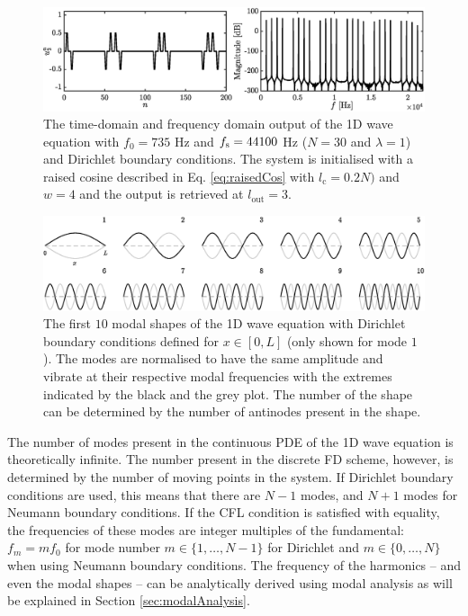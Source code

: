 \begin{figure}[h]
    \includegraphics[width=\textwidth]{figures/fdtd/oneDWaveOutput.eps}
    \caption{The time-domain and frequency domain output of the 1D wave equation with $f_0 = 735$ Hz and $f_\text{s} = 44100$ Hz ($N = 30$ and $\lambda = 1$) and Dirichlet boundary conditions. The system is initialised with a raised cosine described in Eq. \eqref{eq:raisedCos} with $l_\text{c} = 0.2N)$ and $w=4$ and the output is retrieved at $l_\text{out} = 3$. \label{fig:1DWaveOutput}}
\end{figure}

\begin{figure}[h]
    \includegraphics[width=\textwidth]{figures/fdtd/modes.eps}
    \caption{The first $10$ modal shapes of the 1D wave equation with Dirichlet boundary conditions defined for $x\in[0, L]$ (only shown for mode $1$). The modes are normalised to have the same amplitude and vibrate at their respective modal frequencies with the extremes indicated by the black and the grey plot. The number of the shape can be determined by the number of antinodes present in the shape. \label{fig:modes}}
\end{figure}

The number of modes present in the continuous PDE of the 1D wave equation is theoretically infinite. The number present in the discrete FD scheme, however, is determined by the number of moving points in the system. If Dirichlet boundary conditions are used, this means that there are $N-1$ modes, and $N+1$ modes for Neumann boundary conditions. If the CFL condition is satisfied with equality, the frequencies of these modes are integer multiples of the fundamental: $f_m = mf_0$ for mode number $m \in \{1, \hdots, N-1\}$ for Dirichlet and $m \in \{0, \hdots, N\}$ when using Neumann boundary conditions. The frequency of the harmonics -- and even the modal shapes -- can be analytically derived using modal analysis as will be explained in Section \ref{sec:modalAnalysis}.

